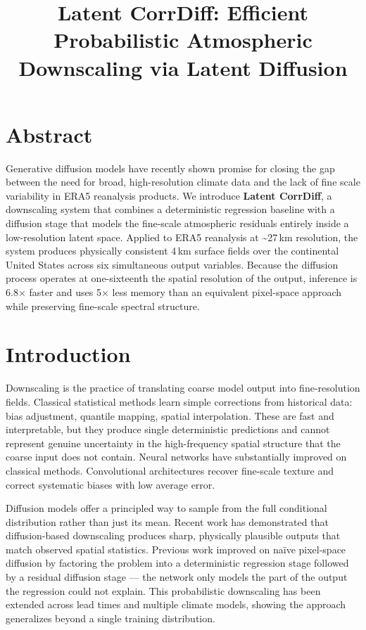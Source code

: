 \documentclass[10pt]{article}
\title{\textbf{Latent CorrDiff: Efficient Probabilistic Atmospheric Downscaling via Latent Diffusion}}
\author{}
\date{}
\begin{document}
\maketitle

\section{Abstract}

Generative diffusion models have recently shown promise for closing the gap between the need for broad, high-resolution climate data and the lack of fine scale variability in ERA5 reanalysis products. We introduce \textbf{Latent CorrDiff}, a downscaling system that combines a deterministic regression baseline with a diffusion stage that models the fine-scale atmospheric residuals entirely inside a low-resolution latent space. Applied to ERA5 reanalysis at \textasciitilde27\,km resolution, the system produces physically consistent 4\,km surface fields over the continental United States across six simultaneous output variables. Because the diffusion process operates at one-sixteenth the spatial resolution of the output, inference is 6.8$\times$ faster and uses 5$\times$ less memory than an equivalent pixel-space approach while preserving fine-scale spectral structure.

\section{Introduction}

Downscaling is the practice of translating coarse model output into fine-resolution fields. Classical statistical methods learn simple corrections from historical data: bias adjustment, quantile mapping, spatial interpolation. These are fast and interpretable, but they produce single deterministic predictions and cannot represent genuine uncertainty in the high-frequency spatial structure that the coarse input does not contain. Neural networks have substantially improved on classical methods. Convolutional architectures recover fine-scale texture and correct systematic biases with low average error.

Diffusion models offer a principled way to sample from the full conditional distribution rather than just its mean. Recent work has demonstrated that diffusion-based downscaling produces sharp, physically plausible outputs that match observed spatial statistics. Previous work improved on na\"ive pixel-space diffusion by factoring the problem into a deterministic regression stage followed by a residual diffusion stage --- the network only models the part of the output the regression could not explain. This probabilistic downscaling has been extended across lead times and multiple climate models, showing the approach generalizes beyond a single training distribution.
\end{document}
